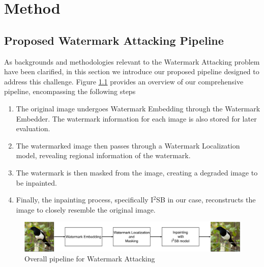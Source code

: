 \chapter{Method}
\label{chapter:method}
\section{Proposed Watermark Attacking Pipeline}
\label{sec:pipeline}
As backgrounds and methodologies relevant to the Watermark Attacking problem have been clarified, in this section we introduce our proposed pipeline designed to address this challenge. Figure \ref{figure:overall_pipeline} provides an overview of our comprehensive pipeline, encompassing the following steps
\begin{enumerate}
 \item The original image undergoes Watermark Embedding through the Watermark Embedder. The watermark information for each image is also stored for later evaluation.
 \item The watermarked image then passes through a Watermark Localization model, revealing regional information of the watermark.
 \item The watermark is then masked from the image, creating a degraded image to be inpainted.
 \item Finally, the inpainting process, specifically I$^2$SB in our case, reconstructs the image to closely resemble the original image.
\end{enumerate}
\begin{figure}[H]
 \centering
 \includegraphics[width = \textwidth]{img/overall.png}
 \vspace{0.5cm}
 \caption{Overall pipeline for Watermark Attacking}
 \label{figure:overall_pipeline}
\end{figure}

%     

%     
